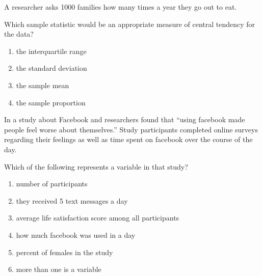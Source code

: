 \begin{frame}
A researcher asks 1000 families how many times a year they go out to eat.
\begin{clicker}{Which sample statistic would be an appropriate measure of central tendency for the data?}
    \begin{enumerate}
        \item
        the interquartile range
        \item
        the standard deviation
        \item
        the sample mean
        \item
        the sample proportion
    \end{enumerate}
\end{clicker}
\end{frame}

\begin{frame}
In a study about Facebook and researchers found that ``using facebook made people feel worse about themselves.'' Study participants completed online surveys regarding their feelings as well as time spent on facebook over the course of the day.
\begin{clicker}{Which of the following represents a variable in that study?}
\begin{enumerate}
    \item
    number of participants
    \item
    they received 5 text messages a day
    \item
    average life satisfaction score among all participants
    \item
    how much facebook was used in a day
    \item
    percent of females in the study
    \item
    more than one is a variable
\end{enumerate}
\end{clicker}
\end{frame}


